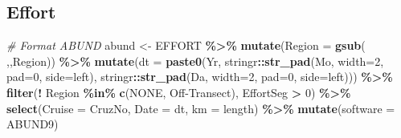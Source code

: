 \documentclass[
]{book}
\newenvironment{Shaded}{\begin{snugshade}}{\end{snugshade}}
\newcommand{\AttributeTok}[1]{\textcolor[rgb]{0.13,0.29,0.53}{#1}}
\newcommand{\CommentTok}[1]{\textcolor[rgb]{0.56,0.35,0.01}{\textit{#1}}}
\newcommand{\DecValTok}[1]{\textcolor[rgb]{0.00,0.00,0.81}{#1}}
\newcommand{\FunctionTok}[1]{\textcolor[rgb]{0.13,0.29,0.53}{\textbf{#1}}}
\newcommand{\NormalTok}[1]{#1}
\newcommand{\OtherTok}[1]{\textcolor[rgb]{0.56,0.35,0.01}{#1}}
\newcommand{\SpecialCharTok}[1]{\textcolor[rgb]{0.81,0.36,0.00}{\textbf{#1}}}
\newcommand{\StringTok}[1]{\textcolor[rgb]{0.31,0.60,0.02}{#1}}
\begin{document}
\hypertarget{effort}{%
\subsection*{Effort}\label{effort}}

\begin{Shaded}
\begin{Highlighting}[]
\CommentTok{\# Format ABUND}
\NormalTok{abund }\OtherTok{\textless{}{-}} 
\NormalTok{  EFFORT }\SpecialCharTok{\%\textgreater{}\%} 
  \FunctionTok{mutate}\NormalTok{(}\AttributeTok{Region =} \FunctionTok{gsub}\NormalTok{(}\StringTok{\textquotesingle{} \textquotesingle{}}\NormalTok{,}\StringTok{\textquotesingle{}\textquotesingle{}}\NormalTok{,Region)) }\SpecialCharTok{\%\textgreater{}\%}
  \FunctionTok{mutate}\NormalTok{(}\AttributeTok{dt =} \FunctionTok{paste0}\NormalTok{(Yr,}
\NormalTok{                     stringr}\SpecialCharTok{::}\FunctionTok{str\_pad}\NormalTok{(Mo, }\AttributeTok{width=}\DecValTok{2}\NormalTok{, }\AttributeTok{pad=}\StringTok{\textquotesingle{}0\textquotesingle{}}\NormalTok{, }\AttributeTok{side=}\StringTok{\textquotesingle{}left\textquotesingle{}}\NormalTok{),}
\NormalTok{                     stringr}\SpecialCharTok{::}\FunctionTok{str\_pad}\NormalTok{(Da, }\AttributeTok{width=}\DecValTok{2}\NormalTok{, }\AttributeTok{pad=}\StringTok{\textquotesingle{}0\textquotesingle{}}\NormalTok{, }\AttributeTok{side=}\StringTok{\textquotesingle{}left\textquotesingle{}}\NormalTok{))) }\SpecialCharTok{\%\textgreater{}\%} 
  \FunctionTok{filter}\NormalTok{(}\SpecialCharTok{!}\NormalTok{ Region }\SpecialCharTok{\%in\%} \FunctionTok{c}\NormalTok{(}\StringTok{\textquotesingle{}NONE\textquotesingle{}}\NormalTok{, }\StringTok{\textquotesingle{}Off{-}Transect\textquotesingle{}}\NormalTok{),}
\NormalTok{         EffortSeg }\SpecialCharTok{\textgreater{}} \DecValTok{0}\NormalTok{) }\SpecialCharTok{\%\textgreater{}\%} 
  \FunctionTok{select}\NormalTok{(}\AttributeTok{Cruise =}\NormalTok{ CruzNo, }\AttributeTok{Date =}\NormalTok{ dt, }\AttributeTok{km =}\NormalTok{ length) }\SpecialCharTok{\%\textgreater{}\%} 
  \FunctionTok{mutate}\NormalTok{(}\AttributeTok{software =} \StringTok{\textquotesingle{}ABUND9\textquotesingle{}}\NormalTok{)}
  

\end{Highlighting}
\end{Shaded}
\end{document}
